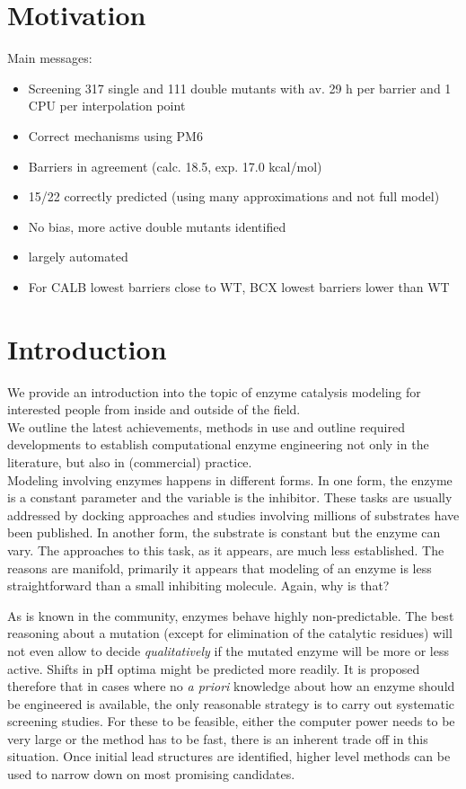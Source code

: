 \section{Motivation}\label{sec:mot}
Main messages:
\begin{itemize}
\item Screening 317 single and 111 double mutants with av. 29 h per barrier and 1 CPU per interpolation point
\item Correct mechanisms using PM6
\item Barriers in agreement (calc. 18.5, exp. 17.0 kcal/mol)
\item 15/22 correctly predicted (using many approximations and not full model)
\item No bias, more active double mutants identified
\item largely automated
\item For CALB lowest barriers close to WT, BCX lowest barriers lower than WT
\end{itemize}


\section{Introduction}\label{sec:intro}
We provide an introduction into the topic of enzyme catalysis modeling for interested people from inside and outside of the field.\\
We outline the latest achievements, methods in use and outline required developments to establish computational enzyme engineering not only in the literature, but also in (commercial) practice.\\
Modeling involving enzymes happens in different forms.
In one form, the enzyme is a constant parameter and the variable is the inhibitor.
These tasks are usually addressed by docking approaches and studies involving millions of substrates have been published\cite{zhou2010high}.
In another form, the substrate is constant but the enzyme can vary.
The approaches to this task, as it appears, are much less established.
The reasons are manifold, primarily it appears that modeling of an enzyme is less straightforward than a small inhibiting molecule.
Again, why is that?

As is known in the community, enzymes behave highly non-predictable.
The best reasoning about a mutation (except for elimination of the catalytic residues) will not even allow to decide \textit{qualitatively} if the mutated enzyme will be more or less active.
Shifts in pH optima might be predicted more readily\cite{ludwiczek2013strategies}.
It is proposed therefore that in cases where no \textit{a priori} knowledge about how an enzyme should be engineered is available, the only reasonable strategy is to carry out systematic screening studies.
For these to be feasible, either the computer power needs to be very large or the method has to be fast, there is an inherent trade off in this situation.
Once initial lead structures are identified, higher level methods can be used to narrow down on most promising candidates.

